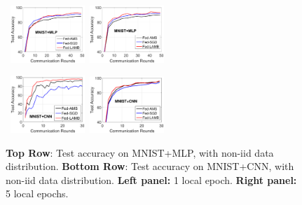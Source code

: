 \documentclass{article}
\begin{document}
\begin{figure}[H]
    \begin{center}
        \mbox{
        \includegraphics[width=0.25\textwidth]{figure/mnist_testerror_mlp_ep1_client50_iid0.eps}
        \includegraphics[width=0.25\textwidth]{figure/mnist_testerror_mlp_ep5_client50_iid0.eps}
        }
        
        \mbox{
        \includegraphics[width=0.25\textwidth]{figure/mnist_testerror_cnn_ep1_client60_iid0.eps}
        \includegraphics[width=0.25\textwidth]{figure/mnist_testerror_cnn_ep5_client50_iid0.eps}
        }
    \end{center}
	\caption{\textbf{Top Row}: Test accuracy on MNIST+MLP, with non-iid data distribution. \textbf{Bottom Row}: Test accuracy on MNIST+CNN, with non-iid data distribution. \textbf{Left panel:} 1 local epoch. \textbf{Right panel:} 5 local epochs.}
	\label{fig:mnist-mlp-noniid}
\end{figure}

\end{document}
